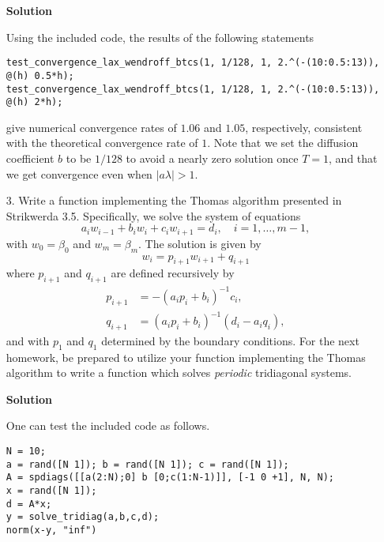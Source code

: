 \documentclass{article}
\providecommand{\abs}[1]{\left\lvert#1\right\rvert}
\begin{document}
\begin{itemize}
\textbf{Solution}

Using the included code, the results of the following statements
\begin{verbatim}
test_convergence_lax_wendroff_btcs(1, 1/128, 1, 2.^(-(10:0.5:13)), @(h) 0.5*h);
test_convergence_lax_wendroff_btcs(1, 1/128, 1, 2.^(-(10:0.5:13)), @(h) 2*h);
\end{verbatim}
give numerical convergence rates of $1.06$ and $1.05$, respectively, consistent with the theoretical convergence rate of $1$. Note that we set the diffusion coefficient $b$ to be $1/128$ to avoid a nearly zero solution once $T = 1$, and that we get convergence even when $\abs{a\lambda} > 1$.

\item[3.] Write a function implementing the Thomas algorithm presented in Strikwerda 3.5. Specifically, we solve the system of equations
\begin{equation*}
a_i w_{i-1} + b_i w_i + c_i w_{i+1} = d_i, \quad i = 1, \dotsc, m-1,
\end{equation*}
with $w_0 = \beta_0$ and $w_m = \beta_m$. The solution is given by
\begin{equation*}
w_i = p_{i+1} w_{i+1} + q_{i+1}
\end{equation*}
where $p_{i+1}$ and $q_{i+1}$ are defined recursively by
\begin{align*}
p_{i+1} & = -\left( a_i p_i + b_i \right)^{-1} c_i, \\
q_{i+1} & = \left( a_i p_i + b_i \right)^{-1} \left( d_i - a_i q_i \right),
\end{align*}
and with $p_1$ and $q_1$ determined by the boundary conditions. For the next homework, be prepared to utilize your function implementing the Thomas algorithm to write a function which solves \emph{periodic} tridiagonal systems.

\textbf{Solution}

One can test the included code as follows.
\begin{verbatim}
N = 10;
a = rand([N 1]); b = rand([N 1]); c = rand([N 1]);
A = spdiags([[a(2:N);0] b [0;c(1:N-1)]], [-1 0 +1], N, N);
x = rand([N 1]);
d = A*x;
y = solve_tridiag(a,b,c,d);
norm(x-y, "inf")
\end{verbatim}

\end{itemize}
\end{document}
